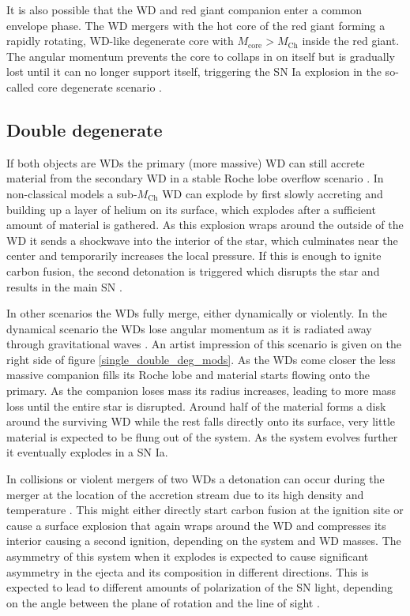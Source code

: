 \documentclass[a4paper,oneside,12pt, class=Latex/Classes/PhDthesisPSnPDF, crop=false]{standalone}
\begin{document}
It is also possible that the WD and red giant companion enter a common envelope phase. The WD mergers with the hot core of the red giant forming a rapidly rotating, WD-like degenerate core with $M_\text{core}>M_\text{Ch}$ inside the red giant. The angular momentum prevents the core to collaps in on itself but is gradually lost until it can no longer support itself, triggering the SN Ia explosion in the so-called core degenerate scenario \citep{Kashi_core_deg}.


\subsection{Double degenerate}
If both objects are WDs the primary (more massive) WD can still accrete material from the secondary WD in a stable Roche lobe overflow scenario \citep{CO_accretion_II, CO_accretion_I}. In non-classical models a sub-$M_\text{Ch}$ WD can explode by first slowly accreting and building up a layer of helium on its surface, which explodes after a sufficient amount of material is gathered. As this explosion wraps around the outside of the WD it sends a shockwave into the interior of the star, which culminates near the center and temporarily increases the local pressure. If this is enough to ignite carbon fusion, the second detonation is triggered which disrupts the star and results in the main SN \citep{Taam_ddet, Livne_ddet, Shen_ddet, Fink_ddet}.

In other scenarios the WDs fully merge, either dynamically or violently. In the dynamical scenario the WDs lose angular momentum as it is radiated away through gravitational waves \citep{Iben_Double_degenerate, Webbink_Double_degenerate}. An artist impression of this scenario is given on the right side of figure \ref{single_double_deg_mods}. As the WDs come closer the less massive companion fills its Roche lobe and material starts flowing onto the primary. As the companion loses mass its radius increases, leading to more mass loss until the entire star is disrupted. Around half of the material forms a disk around the surviving WD while the rest falls directly onto its surface, very little material is expected to be flung out of the system. As the system evolves further it eventually explodes in a SN Ia.

In collisions or violent mergers of two WDs a detonation can occur during the merger at the location of the accretion stream due to its high density and temperature \citep{Rosswog_merger, Pakmor_merger, Pakmor_merger2}. This might either directly start carbon fusion at the ignition site or cause a surface explosion that again wraps around the WD and compresses its interior causing a second ignition, depending on the system and WD masses. The asymmetry of this system when it explodes is expected to cause significant asymmetry in the ejecta and its composition in different directions. This is expected to lead to different amounts of polarization of the SN light, depending on the angle between the plane of rotation and the line of sight \citep{Wang_merger_pol, Bulla_merger_pol}.
\end{document}
